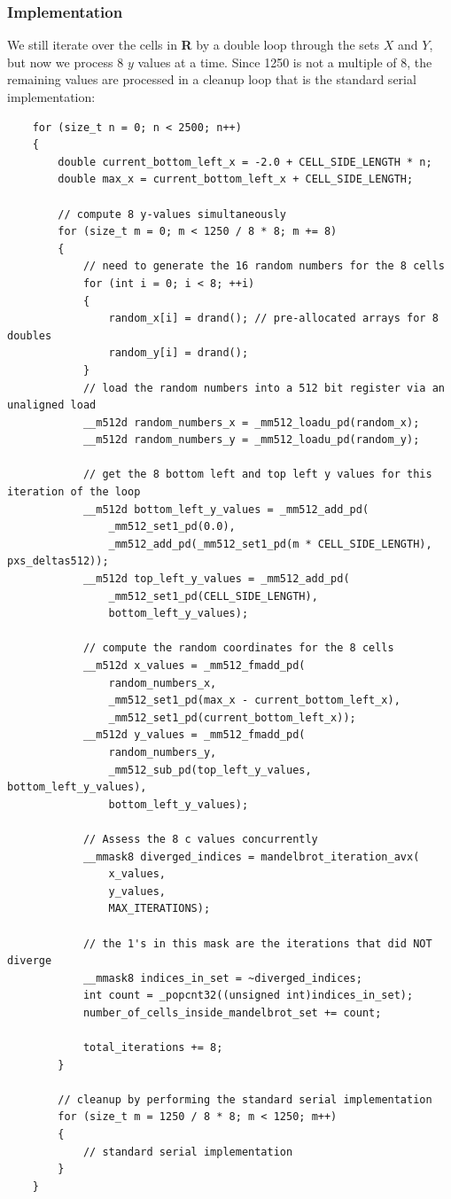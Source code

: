 \documentclass{article}
\begin{document}
\subsubsection{Implementation}
We still iterate over the cells in \textbf{R} by a double loop through the sets 
$X$ and $Y$, but now we process 8 $y$ values at a time. Since 1250 is not a multiple of 8, the remaining 
values are processed in a cleanup loop that is the standard serial implementation:
\begin{lstlisting}
    for (size_t n = 0; n < 2500; n++)
    {
        double current_bottom_left_x = -2.0 + CELL_SIDE_LENGTH * n;
        double max_x = current_bottom_left_x + CELL_SIDE_LENGTH;

        // compute 8 y-values simultaneously
        for (size_t m = 0; m < 1250 / 8 * 8; m += 8)
        {
            // need to generate the 16 random numbers for the 8 cells
            for (int i = 0; i < 8; ++i)
            {
                random_x[i] = drand(); // pre-allocated arrays for 8 doubles
                random_y[i] = drand();
            }
            // load the random numbers into a 512 bit register via an unaligned load
            __m512d random_numbers_x = _mm512_loadu_pd(random_x);
            __m512d random_numbers_y = _mm512_loadu_pd(random_y);

            // get the 8 bottom left and top left y values for this iteration of the loop
            __m512d bottom_left_y_values = _mm512_add_pd(
                _mm512_set1_pd(0.0),
                _mm512_add_pd(_mm512_set1_pd(m * CELL_SIDE_LENGTH), pxs_deltas512));
            __m512d top_left_y_values = _mm512_add_pd(
                _mm512_set1_pd(CELL_SIDE_LENGTH),
                bottom_left_y_values);

            // compute the random coordinates for the 8 cells
            __m512d x_values = _mm512_fmadd_pd(
                random_numbers_x,
                _mm512_set1_pd(max_x - current_bottom_left_x),
                _mm512_set1_pd(current_bottom_left_x));
            __m512d y_values = _mm512_fmadd_pd(
                random_numbers_y,
                _mm512_sub_pd(top_left_y_values, bottom_left_y_values),
                bottom_left_y_values);

            // Assess the 8 c values concurrently
            __mmask8 diverged_indices = mandelbrot_iteration_avx(
                x_values,
                y_values,
                MAX_ITERATIONS);

            // the 1's in this mask are the iterations that did NOT diverge
            __mmask8 indices_in_set = ~diverged_indices;
            int count = _popcnt32((unsigned int)indices_in_set);
            number_of_cells_inside_mandelbrot_set += count;

            total_iterations += 8;
        }

        // cleanup by performing the standard serial implementation
        for (size_t m = 1250 / 8 * 8; m < 1250; m++)
        {
            // standard serial implementation
        }
    }
\end{lstlisting}
\end{document}
